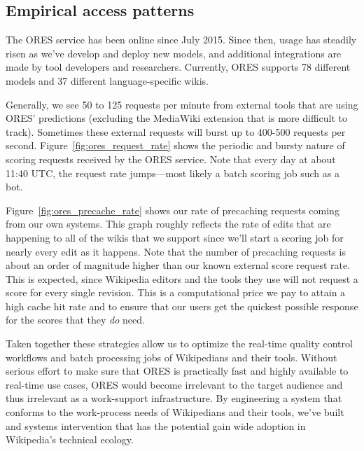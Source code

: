 \subsection{Empirical access patterns}


The ORES service has been online since July 2015\cite{halfaker2015artificial}.  Since then, usage has steadily risen as we've develop and deploy new models, and additional integrations are made by tool developers and researchers.  Currently, ORES supports 78 different models and 37 different language-specific wikis.

Generally, we see 50 to 125 requests per minute from external tools that are using ORES' predictions (excluding the MediaWiki extension that is more difficult to track).  Sometimes these external requests will burst up to 400-500 requests per second.  Figure~\ref{fig:ores_request_rate} shows the periodic and bursty nature of scoring requests received by the ORES service.  Note that every day at about 11:40 UTC, the request rate jumps---most likely a batch scoring job such as a bot.

Figure~\ref{fig:ores_precache_rate} shows our rate of precaching requests coming from our own systems.  This graph roughly reflects the rate of edits that are happening to all of the wikis that we support since we'll start a scoring job for nearly every edit as it happens.  Note that the number of precaching requests is about an order of magnitude higher than our known external score request rate.  This is expected, since Wikipedia editors and the tools they use will not request a score for every single revision.  This is a computational price we pay to attain a high cache hit rate and to ensure that our users get the quickest possible response for the scores that they \emph{do} need.

Taken together these strategies allow us to optimize the real-time quality control workflows and batch processing jobs of Wikipedians and their tools.  Without serious effort to make sure that ORES is practically fast and highly available to real-time use cases, ORES would become irrelevant to the target audience and thus irrelevant as a work-support infrastructure.  By engineering a system that conforms to the work-process needs of Wikipedians and their tools, we've built and systems intervention that has the potential gain wide adoption in Wikipedia's technical ecology.
